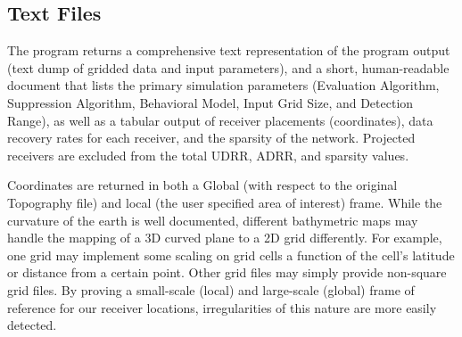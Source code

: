 \subsection{Text Files}
The program returns a comprehensive text representation of the program output (text dump of gridded data and input parameters), and a short, human-readable document that lists the primary simulation parameters (Evaluation Algorithm, Suppression Algorithm, Behavioral Model, Input Grid Size, and Detection Range), as well as a tabular output of receiver placements (coordinates), data recovery rates for each receiver, and the sparsity of the network.  Projected receivers are excluded from the total UDRR, ADRR, and sparsity values.

Coordinates are returned in both a Global (with respect to the original Topography file) and local (the user specified area of interest) frame.  While the curvature of the earth is well documented, different bathymetric maps may handle the mapping of a 3D curved plane to a 2D grid differently.  For example, one grid may implement some scaling on grid cells a function of the cell's latitude or distance from a certain point.  Other grid files may simply provide non-square grid files.  By proving a small-scale (local) and large-scale (global) frame of reference for our receiver locations, irregularities of this nature are more easily detected.

